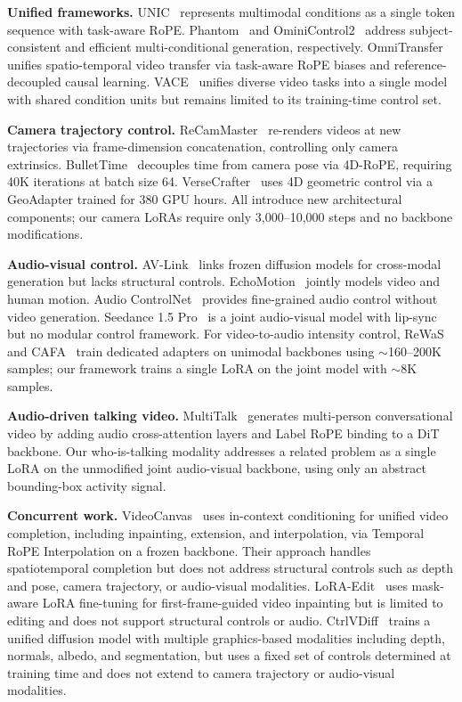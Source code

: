\textbf{Unified frameworks.}
UNIC~\cite{ye2025unic} represents multimodal conditions as a single token sequence with task-aware RoPE.
Phantom~\cite{liu2025phantom} and OminiControl2~\cite{tan2025ominicontrol2} address subject-consistent and efficient multi-conditional generation, respectively.
OmniTransfer~\cite{zhang2026omnitransfer} unifies spatio-temporal video transfer via task-aware RoPE biases and reference-decoupled causal learning.
VACE~\cite{jiang2025vace} unifies diverse video tasks into a single model with shared condition units but remains limited to its training-time control set.

\textbf{Camera trajectory control.}
ReCamMaster~\cite{bai2025recammaster} re-renders videos at new trajectories via frame-dimension concatenation, controlling only camera extrinsics. BulletTime~\cite{wang2025bullettime} decouples time from camera pose via 4D-RoPE, requiring 40K iterations at batch size 64. VerseCrafter~\cite{zheng2026versecrafter} uses 4D geometric control via a GeoAdapter trained for 380 GPU hours. All introduce new architectural components; our camera LoRAs require only 3{,}000--10{,}000 steps and no backbone modifications.

\textbf{Audio-visual control.}
AV-Link~\cite{hajiali2025avlink} links frozen diffusion models for cross-modal generation but lacks structural controls. EchoMotion~\cite{yang2025echomotion} jointly models video and human motion. Audio ControlNet~\cite{zhu2026audiocontrolnet} provides fine-grained audio control without video generation. Seedance 1.5 Pro~\cite{chen2025seedance} is a joint audio-visual model with lip-sync but no modular control framework.
For video-to-audio intensity control, ReWaS~\cite{jeong2024rewas} and CAFA~\cite{benita2025cafa} train dedicated adapters on unimodal backbones using ${\sim}$160--200K samples; our framework trains a single LoRA on the joint model with ${\sim}$8K samples.

\textbf{Audio-driven talking video.}
MultiTalk~\cite{kong2025multitalk} generates multi-person conversational video by adding audio cross-attention layers and Label RoPE binding to a DiT backbone. Our who-is-talking modality addresses a related problem as a single LoRA on the unmodified joint audio-visual backbone, using only an abstract bounding-box activity signal.

\textbf{Concurrent work.}
VideoCanvas~\cite{cai2025videocanvas} uses in-context conditioning for unified video completion, including inpainting, extension, and interpolation, via Temporal RoPE Interpolation on a frozen backbone. Their approach handles spatiotemporal completion but does not address structural controls such as depth and pose, camera trajectory, or audio-visual modalities.
LoRA-Edit~\cite{gao2025loraedit} uses mask-aware LoRA fine-tuning for first-frame-guided video inpainting but is limited to editing and does not support structural controls or audio.
CtrlVDiff~\cite{xi2025ctrlvdiff} trains a unified diffusion model with multiple graphics-based modalities including depth, normals, albedo, and segmentation, but uses a fixed set of controls determined at training time and does not extend to camera trajectory or audio-visual modalities.


